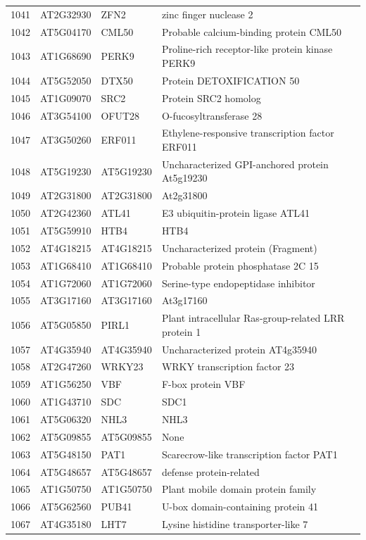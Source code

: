 \documentclass[11pt]{article}
\begin{document}
\begin{center}
\begin{tabular}{rlll}
1041 & AT2G32930 & ZFN2 & zinc finger nuclease 2\\
1042 & AT5G04170 & CML50 & Probable calcium-binding protein CML50\\
1043 & AT1G68690 & PERK9 & Proline-rich receptor-like protein kinase PERK9\\
1044 & AT5G52050 & DTX50 & Protein DETOXIFICATION 50\\
1045 & AT1G09070 & SRC2 & Protein SRC2 homolog\\
1046 & AT3G54100 & OFUT28 & O-fucosyltransferase 28\\
1047 & AT3G50260 & ERF011 & Ethylene-responsive transcription factor ERF011\\
1048 & AT5G19230 & AT5G19230 & Uncharacterized GPI-anchored protein At5g19230\\
1049 & AT2G31800 & AT2G31800 & At2g31800\\
1050 & AT2G42360 & ATL41 & E3 ubiquitin-protein ligase ATL41\\
1051 & AT5G59910 & HTB4 & HTB4\\
1052 & AT4G18215 & AT4G18215 & Uncharacterized protein (Fragment)\\
1053 & AT1G68410 & AT1G68410 & Probable protein phosphatase 2C 15\\
1054 & AT1G72060 & AT1G72060 & Serine-type endopeptidase inhibitor\\
1055 & AT3G17160 & AT3G17160 & At3g17160\\
1056 & AT5G05850 & PIRL1 & Plant intracellular Ras-group-related LRR protein 1\\
1057 & AT4G35940 & AT4G35940 & Uncharacterized protein AT4g35940\\
1058 & AT2G47260 & WRKY23 & WRKY transcription factor 23\\
1059 & AT1G56250 & VBF & F-box protein VBF\\
1060 & AT1G43710 & SDC & SDC1\\
1061 & AT5G06320 & NHL3 & NHL3\\
1062 & AT5G09855 & AT5G09855 & None\\
1063 & AT5G48150 & PAT1 & Scarecrow-like transcription factor PAT1\\
1064 & AT5G48657 & AT5G48657 & defense protein-related\\
1065 & AT1G50750 & AT1G50750 & Plant mobile domain protein family\\
1066 & AT5G62560 & PUB41 & U-box domain-containing protein 41\\
1067 & AT4G35180 & LHT7 & Lysine histidine transporter-like 7\\

\end{tabular}
\end{center}
\end{document}
